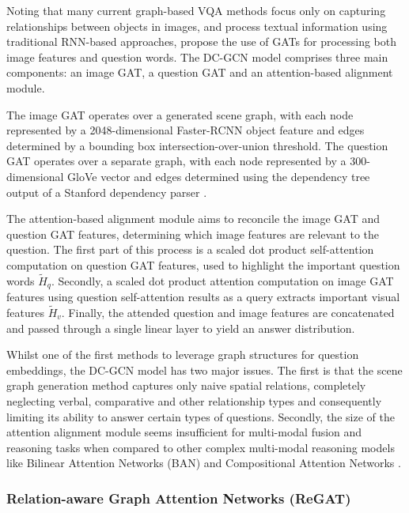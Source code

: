 Noting that many current graph-based VQA methods focus only on capturing relationships between objects in images, and process textual information using traditional RNN-based approaches, \citeauthor{huang2020aligned} propose the use of GATs for processing both image features and question words. The DC-GCN model comprises three main components: an image GAT, a question GAT and an attention-based alignment module.

The image GAT operates over a generated scene graph, with each node represented by a 2048-dimensional Faster-RCNN \cite{ren2016faster} object feature and edges determined by a bounding box intersection-over-union threshold. The question GAT operates over a separate graph, with each node represented by a 300-dimensional GloVe vector \cite{pennington2014glove} and edges determined using the dependency tree output of a Stanford dependency parser \cite{de2014universal}.

The attention-based alignment module aims to reconcile the image GAT and question GAT features, determining which image features are relevant to the question. The first part of this process is a scaled dot product self-attention computation \cite{vaswani2017attention} on question GAT features, used to highlight the important question words \(\tilde{H}_q\). Secondly, a scaled dot product attention computation on image GAT features using question self-attention results as a query extracts important visual features \(\tilde{H}_v\). Finally, the attended question and image features are concatenated and passed through a single linear layer to yield an answer distribution.

Whilst one of the first methods to leverage graph structures for question embeddings, the DC-GCN model has two major issues. The first is that the scene graph generation method captures only naive spatial relations, completely neglecting verbal, comparative and other relationship types and consequently limiting its ability to answer certain types of questions. Secondly, the size of the attention alignment module seems insufficient for multi-modal fusion and reasoning tasks when compared to other complex multi-modal reasoning models like Bilinear Attention Networks (BAN) \cite{kim2018bilinear} and Compositional Attention Networks \cite{hudson2018compositional}.

\subsubsection{Relation-aware Graph Attention Networks (ReGAT)}

